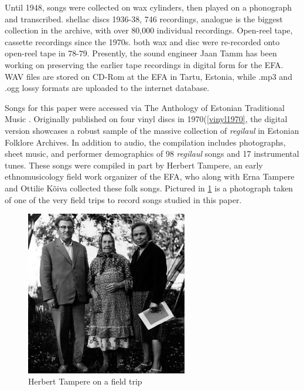 Until 1948, songs were collected on wax cylinders, then played on a phonograph and transcribed. shellac discs 1936-38, 746 recordings, 
analogue is the biggest collection in the archive, with over 80,000 individual recordings. Open-reel tape, cassette recordings since the 1970s. 
both wax and disc were re-recorded onto open-reel tape in 78-79.
Presently, the sound engineer Jaan Tamm has been working on preserving the earlier tape recordings in digital form for the EFA. WAV files are stored on CD-Rom at the EFA in Tartu, Estonia, while .mp3 and .ogg lossy formats are uploaded to the internet database. 
%
%




Songs for this paper were accessed via The Anthology of Estonian Traditional Music \citep{tampereAnthologyEstonianTraditional2016}. Originally published on four vinyl discs in 1970(\ref{vinyl1970}, the digital version showcases a robust sample of the massive collection of {\it regilaul} in Estonian Folklore Archives. In addition to audio, the  compilation includes  photographs, sheet music, and performer demographics of 98 {\it regilaul} songs and 17 instrumental tunes. 
These songs were compiled in part by Herbert Tampere, an early ethnomusicology field work organizer of the EFA, who along with Erna Tampere and Ottilie Kõiva collected these folk songs. Pictured in \ref{tampy} is a photograph taken of one of the very field trips to record songs studied in this paper. 

\begin{figure}[htb]
\centering

\includegraphics[width=200pt]{figures/Mf_07027_Tampered_Orik.jpg}
\caption{Herbert Tampere on a field trip}
\label{tampy}
\end{figure}


